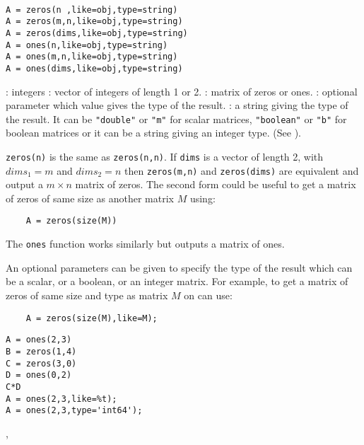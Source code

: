 \begin{mandesc}
  \\ 
\end{mandesc}
\begin{calling_sequence}
\begin{verbatim}
A = zeros(n ,like=obj,type=string)
A = zeros(m,n,like=obj,type=string)
A = zeros(dims,like=obj,type=string)
A = ones(n,like=obj,type=string)
A = ones(m,n,like=obj,type=string)
A = ones(dims,like=obj,type=string)
\end{verbatim}
\end{calling_sequence}
\begin{parameters}
  \begin{varlist}
    : integers
    : vector of integers of length 1 or 2.
    : matrix of zeros or ones.
    : optional parameter which value gives the type of the result.
    : a string giving the type of the result. It can be \verb+"double"+ or \verb+"m"+ for 
    scalar matrices, \verb+"boolean"+ or \verb+"b"+ for boolean matrices or it can be a string giving 
    an integer type. (See ).
  \end{varlist}
\end{parameters}

\begin{mandescription}
\verb+zeros(n)+ is the same as \verb+zeros(n,n)+. If \verb+dims+ is a vector of length 2, 
with $dims_1 = m$ and $dims_2 = n$ then \verb+zeros(m,n)+ and  \verb+zeros(dims)+ are equivalent 
and output a $m \times n$ matrix of zeros. The second form could be useful to get a matrix of 
zeros of same size as another matrix $M$ using:
\begin{verbatim}
    A = zeros(size(M))
\end{verbatim}

The \verb+ones+ function works similarly but outputs a matrix of ones.

An optional parameters can be given to specify the type of the result which can 
be a scalar, or a boolean, or an integer matrix. For example, to get a matrix of 
zeros of same size and type as matrix $M$ on can use:
\begin{verbatim}
    A = zeros(size(M),like=M);
\end{verbatim}

\end{mandescription}

\begin{examples}
\begin{Verbatim}
A = ones(2,3) 
B = zeros(1,4)
C = zeros(3,0)
D = ones(0,2)
C*D
A = ones(2,3,like=%t);
A = ones(2,3,type='int64');
\end{Verbatim} 

\end{examples}

\begin{manseealso}
, 
\end{manseealso}

